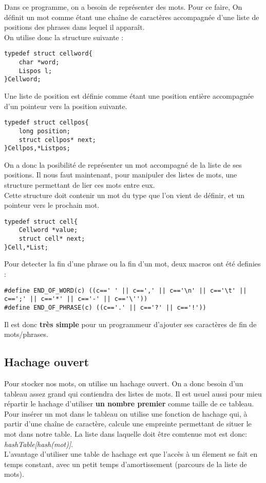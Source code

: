 \documentclass[french, 12pt, titlepage]{article}
\begin{document}
Dans ce programme, on a besoin de représenter des mots. Pour ce faire,
On définit un mot comme étant une chaîne de caractères accompagnée
d'une liste de positions des phrases dans lequel il apparaît.\\
On utilise donc la structure suivante :
\begin{lstlisting}
typedef struct cellword{
    char *word;
    Lispos l;
}Cellword;
\end{lstlisting}

Une liste de position est définie comme étant une position entière
accompagnée d'un pointeur vers la position suivante.

\begin{lstlisting}
typedef struct cellpos{
	long position;
	struct cellpos* next;
}Cellpos,*Listpos;
\end{lstlisting}

On a donc la posibilité de représenter un mot accompagné de la liste
de ses positions. Il nous faut maintenant, pour manipuler des listes
de mots, une structure permettant de lier ces mots entre eux.\\
Cette structure doit contenir un mot du type que l'on vient de
définir, et un pointeur vers le prochain mot.

\begin{lstlisting}
typedef struct cell{
	Cellword *value;
	struct cell* next;
}Cell,*List;
\end{lstlisting}

Pour detecter la fin d'une phrase ou la fin d'un mot, deux macros ont
été definies :

\begin{lstlisting}
#define END_OF_WORD(c) ((c==' ' || c==',' || c=='\n' || c=='\t' || c==';' || c=='*' || c=='-' || c=='\''))
#define END_OF_PHRASE(c) ((c=='.' || c=='?' || c=='!'))
\end{lstlisting}

Il est donc \textbf{très simple} pour un programmeur d'ajouter ses caractères
de fin de mots/phrases.

\subsection{Hachage ouvert}
Pour stocker nos mots, on utilise un hachage ouvert. On a donc besoin
d'un tableau assez grand qui contiendra des listes de mots. Il est usuel
aussi pour mieu répartir le hachage d'utiliser \textbf{un nombre
  premier} comme taille de ce tableau.\\
Pour insérer un mot dans le tableau on utilise une fonction de hachage
qui, à partir d'une chaîne de caractère, calcule une empreinte
permettant de situer le mot dans notre table. La liste dans laquelle
doit être comtenue mot est donc:\\
\textit{hashTable[hash(mot)]}.\\
L'avantage d'utiliser une table de hachage est que l'accès à un élement
se fait en temps constant, avec un petit temps d'amortissement
(parcours de la liste de mots).\\\\
\end{document}
